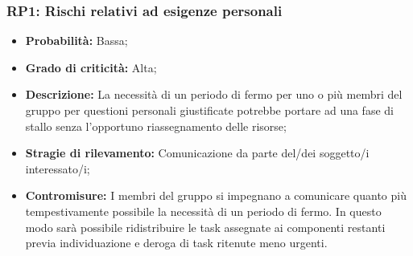 \subsubsection{RP1: Rischi relativi ad esigenze personali}
\begin{itemize}
    \item \textbf{Probabilità:} Bassa;
    \item \textbf{Grado di criticità:} Alta;
    \item \textbf{Descrizione:} La necessità di un periodo di fermo per uno o più membri del gruppo per questioni personali giustificate potrebbe portare ad una fase di stallo senza l'opportuno riassegnamento delle risorse;
    \item \textbf{Stragie di rilevamento:} Comunicazione da parte del/dei soggetto/i interessato/i;
    \item \textbf{Contromisure:} I membri del gruppo si impegnano a comunicare quanto più tempestivamente possibile la necessità di un periodo di fermo. In questo modo sarà possibile ridistribuire le task assegnate ai componenti restanti previa individuazione e deroga di task ritenute meno urgenti.
\end{itemize}